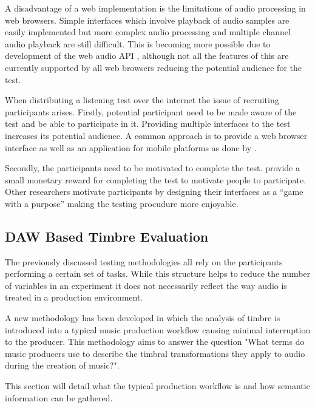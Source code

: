 		A disadvantage of a web implementation is the limitations of audio processing in web browsers. Simple
		interfaces which involve playback of audio samples are easily implemented but more complex audio processing
		and multiple channel audio playback are still difficult. This is becoming more possible due to development
		of the web audio API \citep{adenot2015web}, although not all the features of this are currently supported by
		all web browsers reducing the potential audience for the test.

		When distributing a listening test over the internet the issue of recruiting participants arises. Firstly,
		potential participant need to be made aware of the test and be able to participate in it. Providing multiple
		interfaces to the test increases its potential audience. A common approach is to provide a web browser
		interface as well as an application for mobile platforms as done by \citet{huq2010crowdsourcing}.

		Secondly, the participants need to be motivated to complete the test. \citet{cartwright2013socialeq} provide
		a small monetary reward for completing the test to motivate people to participate. Other researchers
		motivate participants by designing their interfaces as a ``game with a purpose'' \citep{law2007tagatune,
		huq2010crowdsourcing, burgoyne2013hooked} making the testing procudure more enjoyable.

	\subsection{DAW Based Timbre Evaluation} %
	\label{sec:ListeningTests-DistributedListeningTests-DAWBasedTimbreEvaluation}
		The previously discussed testing methodologies all rely on the participants performing a certain set of
		tasks. While this structure helps to reduce the number of variables in an experiment it does not necessarily
		reflect the way audio is treated in a production environment.

		A new methodology has been developed in which the analysis of timbre is introduced into a typical music
		production workflow causing minimal interruption to the producer. This methodology aims to answer the
		question "What terms do music producers use to describe the timbral transformations they apply to audio
		during the creation of music?". 
		
		This section will detail what the typical production workflow is and how semantic information can be
		gathered.

